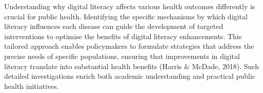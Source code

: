 Understanding why digital literacy affects various health outcomes differently is crucial for public health. Identifying the specific mechanisms by which digital literacy influences each disease can guide the development of targeted interventions to optimise the benefits of digital literacy enhancements. This tailored approach enables policymakers to formulate strategies that address the precise needs of specific populations, ensuring that improvements in digital literacy translate into substantial health benefits (Harris \& McDade, 2018). Such detailed investigations enrich both academic understanding and practical public health initiatives.

